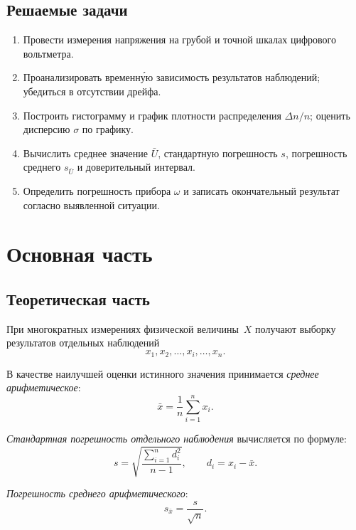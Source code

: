 \documentclass[12pt,a4paper]{article}
\begin{document}
\subsection{Решаемые задачи}

\begin{enumerate}
\item Провести измерения напряжения на грубой и точной шкалах цифрового
      вольтметра.
\item Проанализировать временну́ю зависимость результатов наблюдений; убедиться
      в отсутствии дрейфа.
\item Построить гистограмму и график плотности распределения $\Delta n / n$;
      оценить дисперсию $\sigma$ по графику.
\item Вычислить среднее значение $\bar{U}$, стандартную погрешность $s$,
      погрешность среднего $s_{\bar{U}}$ и доверительный интервал.
\item Определить погрешность прибора $\omega$ и записать окончательный результат
      согласно выявленной ситуации.
\end{enumerate}

\section{Основная часть}

\subsection{Теоретическая часть}

При многократных измерениях физической величины~$X$ получают выборку результатов
отдельных наблюдений
\begin{equation}
  x_1, x_2, \ldots, x_i, \ldots, x_n.
\end{equation}

В качестве наилучшей оценки истинного значения принимается \emph{среднее
арифметическое}:
\begin{equation}
  \bar{x} = \frac{1}{n}\sum_{i=1}^{n} x_i.
  \label{eq:mean}
\end{equation}

\emph{Стандартная погрешность отдельного наблюдения} вычисляется по формуле:
\begin{equation}
  s = \sqrt{\frac{\sum_{i=1}^{n} d_i^2}{n-1}}, \qquad d_i = x_i - \bar{x}.
  \label{eq:s}
\end{equation}

\emph{Погрешность среднего арифметического}:
\begin{equation}
  s_{\bar{x}} = \frac{s}{\sqrt{n}}.
  \label{eq:smean}
\end{equation}
\end{document}
